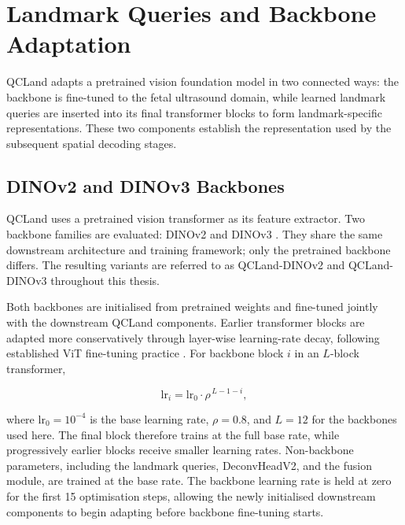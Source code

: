 
\section{Landmark Queries and Backbone Adaptation}
\label{sec:method-queries}

QCLand adapts a pretrained vision foundation model in two connected
ways: the backbone is fine-tuned to the fetal ultrasound domain,
while learned landmark queries are inserted into its final
transformer blocks to form landmark-specific representations. These
two components establish the representation used by the subsequent
spatial decoding stages.


\subsection{DINOv2 and DINOv3 Backbones}
\label{sec:method-backbone}

QCLand uses a pretrained vision transformer as its feature extractor.
Two backbone families are evaluated: DINOv2
\parencite{oquab2023dinov2} and DINOv3
\parencite{simeoni2025dinov3}. They share the same downstream
architecture and training framework; only the pretrained backbone
differs. The resulting variants are referred to as QCLand-DINOv2 and
QCLand-DINOv3 throughout this thesis.

Both backbones are initialised from pretrained weights and fine-tuned
jointly with the downstream QCLand components. Earlier transformer
blocks are adapted more conservatively through layer-wise
learning-rate decay, following established ViT fine-tuning practice
\parencite{bao2022beit}. For backbone block $i$ in an $L$-block
transformer,

\begin{equation}
  \label{eq:llrd}
  \mathrm{lr}_i
  =
  \mathrm{lr}_0
  \cdot
  \rho^{\,L-1-i},
\end{equation}

where $\mathrm{lr}_0 = 10^{-4}$ is the base learning rate,
$\rho = 0.8$, and $L=12$ for the backbones used here. The final block
therefore trains at the full base rate, while progressively earlier
blocks receive smaller learning rates. Non-backbone parameters,
including the landmark queries, DeconvHeadV2, and the fusion module,
are trained at the base rate. The backbone learning rate is held at
zero for the first 15 optimisation steps, allowing the newly
initialised downstream components to begin adapting before backbone
fine-tuning starts.

